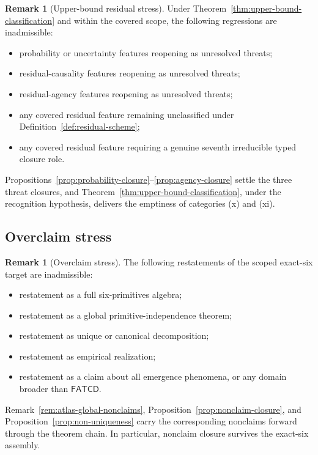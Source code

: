 \documentclass[11pt]{article}
\theoremstyle{definition}
\newtheorem{remark}[theorem]{Remark}
\newcommand{\FATCD}{\ensuremath{\mathsf{FATCD}}}
\begin{document}
\begin{remark}[Upper-bound residual stress]\label{prop:residual-stress}
Under Theorem~\ref{thm:upper-bound-classification} and within the covered
scope, the following regressions are inadmissible:
\begin{itemize}[topsep=2pt,itemsep=1pt]
  \item probability or uncertainty features reopening as unresolved
    threats;
  \item residual-causality features reopening as unresolved threats;
  \item residual-agency features reopening as unresolved threats;
  \item any covered residual feature remaining unclassified under
    Definition~\ref{def:residual-scheme};
  \item any covered residual feature requiring a genuine seventh
    irreducible typed closure role.
\end{itemize}
Propositions~\ref{prop:probability-closure}--\ref{prop:agency-closure}
settle the three threat closures, and
Theorem~\ref{thm:upper-bound-classification}, under the recognition
hypothesis, delivers the emptiness of categories (x) and (xi).
\end{remark}

\subsection{Overclaim stress}\label{subsec:overclaim-stress}

\begin{remark}[Overclaim stress]\label{prop:overclaim-stress}
The following restatements of the scoped exact-six target are
inadmissible:
\begin{itemize}[topsep=2pt,itemsep=1pt]
  \item restatement as a full six-primitives algebra;
  \item restatement as a global primitive-independence theorem;
  \item restatement as unique or canonical decomposition;
  \item restatement as empirical realization;
  \item restatement as a claim about all emergence phenomena, or any
    domain broader than \FATCD{}.
\end{itemize}
Remark~\ref{rem:atlas-global-nonclaims},
Proposition~\ref{prop:nonclaim-closure}, and
Proposition~\ref{prop:non-uniqueness} carry the corresponding nonclaims
forward through the theorem chain. In particular, nonclaim closure
survives the exact-six assembly.
\end{remark}
\end{document}
